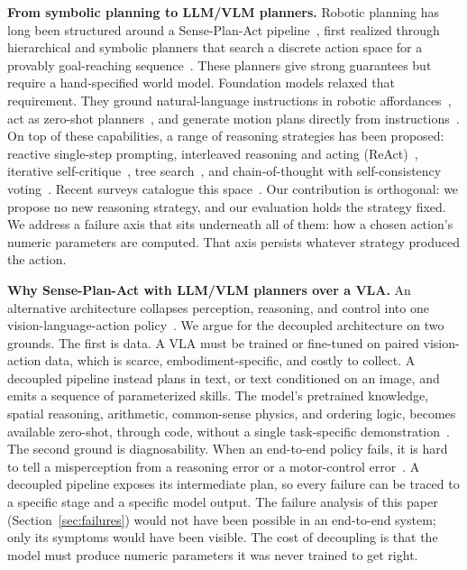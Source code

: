 \textbf{From symbolic planning to LLM/VLM planners.} Robotic planning
has long been structured around a Sense-Plan-Act
pipeline~\cite{garrett2021integrated}, first realized through
hierarchical and symbolic planners that search a discrete action space
for a provably goal-reaching sequence~\cite{kaelbling2011hierarchical}.
These planners give strong guarantees but require a hand-specified
world model. Foundation models relaxed that requirement. They ground
natural-language instructions in robotic
affordances~\cite{ahn2022saycan}, act as zero-shot
planners~\cite{huang2022zeroshot}, and generate motion plans directly
from instructions~\cite{lin2023text2motion}. On top of these
capabilities, a range of reasoning strategies has been proposed:
reactive single-step prompting, interleaved reasoning and acting
(ReAct)~\cite{yao2022react}, iterative
self-critique~\cite{madaan2023selfrefine, zhou2024isrllm}, tree
search~\cite{yao2023tot}, and chain-of-thought with self-consistency
voting~\cite{wei2022cot, wang2022selfconsistency}. Recent surveys
catalogue this space~\cite{kim2024survey, wang2025robotics,
huang2024planningsurvey, berti2025emergent, billard2025roadmap,
favaliRAS}. Our contribution is orthogonal: we propose no new
reasoning strategy, and our evaluation holds the strategy fixed. We
address a failure axis that sits underneath all of them: how a chosen
action's numeric parameters are computed. That axis persists whatever
strategy produced the action.

\textbf{Why Sense-Plan-Act with LLM/VLM planners over a VLA.} An
alternative architecture collapses perception, reasoning, and control
into one vision-language-action policy~\cite{brohan2023rt2,
driess2023palme, geminiteam2025robotics15, kim2024openvla}. We argue
for the decoupled architecture on two grounds. The first is data. A VLA
must be trained or fine-tuned on paired vision-action data, which is
scarce, embodiment-specific, and costly to collect. A decoupled
pipeline instead plans in text, or text conditioned on an image, and
emits a sequence of parameterized skills. The model's pretrained
knowledge, spatial reasoning, arithmetic, common-sense physics, and
ordering logic, becomes available zero-shot, through code, without a
single task-specific demonstration~\cite{liang2023codeaspolicies,
huang2023voxposer, huang2022innermonologue, singh2023progprompt}. The
second ground is diagnosability. When an end-to-end policy fails, it is
hard to tell a misperception from a reasoning error or a motor-control
error~\cite{favaliRAS}. A decoupled pipeline exposes its intermediate
plan, so every failure can be traced to a specific stage and a specific
model output. The failure analysis of this paper
(Section~\ref{sec:failures}) would not have been possible in an
end-to-end system; only its symptoms would have been visible. The cost
of decoupling is that the model must produce numeric parameters it was
never trained to get right. 

